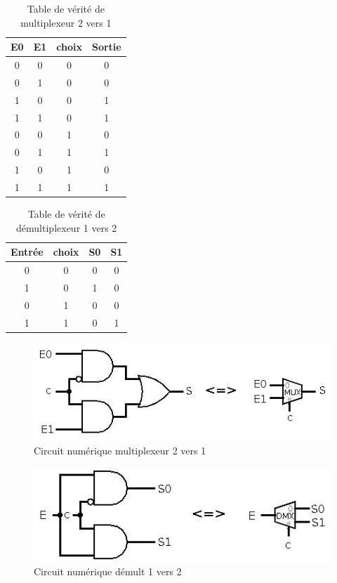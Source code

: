 \documentclass[10pt,a4paper,twoside]{article}
\begin{document}
\begin{table}[hbtp]
	\caption{Table de vérité de multiplexeur 2 vers 1}
	\centering
	\begin{tabular}{c|c|c||c}
		E0 & E1 & choix & Sortie \\ 
		\hline 
		0 & 0 & 0 & 0 \\ 
		0 & 1 & 0 & 0 \\ 
		1 & 0 & 0 & 1 \\ 
		1 & 1 & 0 & 1 \\ 
		0 & 0 & 1 & 0 \\ 
		0 & 1 & 1 & 1 \\ 
		1 & 0 & 1 & 0 \\ 
		1 & 1 & 1 & 1 \\ 
	\end{tabular}
\end{table}

\begin{table}[hbtp]
	\caption{Table de vérité de démultiplexeur 1 vers 2}
	\centering
	\begin{tabular}{c|c||c|c}
	Entrée & choix & S0 & S1 \\ 
	\hline 
	0 & 0 & 0 & 0 \\ 
	1 & 0 & 1 & 0 \\ 
	0 & 1 & 0 & 0 \\ 
	1 & 1 & 0 & 1 \\ 
	\end{tabular} 
\end{table}

\begin{figure}[hbtp]
\caption{Circuit numérique multiplexeur 2 vers 1}
\centering
\includegraphics[scale=0.5]{Mult2vers1.jpg}
\end{figure}

\begin{figure}[hbtp]
\caption{Circuit numérique démult 1 vers 2}
\centering
\includegraphics[scale=0.5]{Mult1vers2.jpg}
\end{figure}
\end{document}
